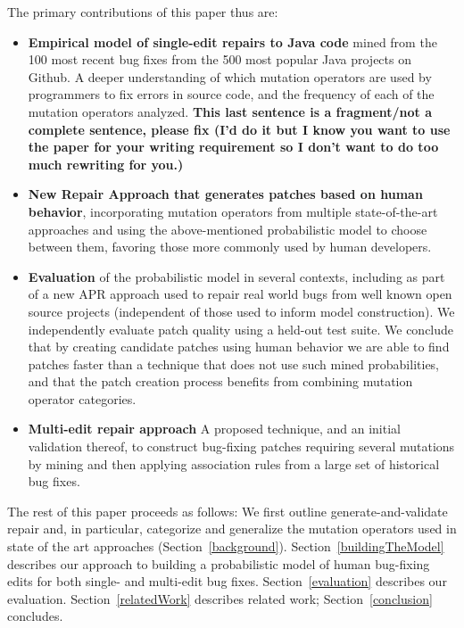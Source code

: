 \documentclass[conference]{IEEEtran}
\newcommand{\todo}[1]
  {{\scriptsize \textbf{\color{red} {#1}}}}
\begin{document}
The primary contributions of this paper thus are:
\begin{itemize}
    \item \textbf{Empirical model of single-edit repairs to Java code} mined
      from the 100 most recent bug fixes from the 500 most popular Java projects on
    Github.   A deeper
    understanding of which mutation operators are used by programmers to fix
    errors in source code, and the frequency of each of the mutation operators
    analyzed. \todo{This last sentence is a fragment/not a complete sentence,
      please fix (I'd do it but I know you want to use the paper for your
      writing requirement so I don't want to do too much rewriting for you.)}
  \item \textbf{New Repair Approach that generates patches based on human behavior}, incorporating mutation operators
    from multiple state-of-the-art approaches and 
    using the above-mentioned probabilistic model to choose between them, favoring those more commonly
    used by human developers.
  \item \textbf{Evaluation} of the probabilistic model in several
    contexts, including as part of a new APR approach used to repair real world bugs from well
    known open source projects (independent of those used to inform model
    construction). We independently evaluate patch quality using a held-out test
    suite. We conclude that by creating candidate patches using human behavior
    we are able to find patches faster than a technique that does not use such
    mined probabilities, and that the patch creation
    process benefits from combining mutation operator categories.  
  \item \textbf{Multi-edit repair approach} A proposed technique, and an initial
    validation thereof, to construct 
    bug-fixing patches requiring several mutations by mining and then applying association
    rules from a large set of historical bug fixes. 
\end{itemize}

The rest of this paper proceeds as follows: We first outline
generate-and-validate repair and, in particular, 
categorize and generalize the mutation operators used in state of the art
approaches (Section~\ref{background}). Section~\ref{buildingTheModel}
describes our approach to building a probabilistic model of human bug-fixing
edits for both single- and multi-edit bug fixes. Section~\ref{evaluation}
describes our evaluation. Section~\ref{relatedWork} describes
related work; Section~\ref{conclusion} concludes. 
\end{document}
